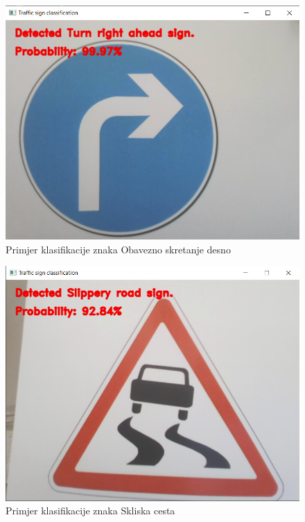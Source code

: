 \documentclass[times, utf8, zavrsni]{fer}
\begin{document}
\begin{figure}[h!]
  \includegraphics[width=\linewidth,trim=4 4 4 4,clip]{images/turn_right.jpeg}
  \caption{Primjer klasifikacije znaka Obavezno skretanje desno}
\end{figure}
\begin{figure}[h!]
  \includegraphics[width=\linewidth,trim=4 4 4 4,clip]{images/slippery.jpeg}
  \caption{Primjer klasifikacije znaka Skliska cesta}
\end{figure}
\end{document}
